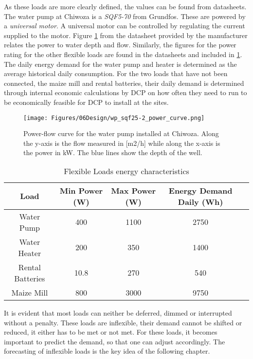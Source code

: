 As these loads are more clearly defined, the values can be found from datasheets\cite{wp_documentation}\cite{water_heater}\cite{maize_mill}. The water pump at Chiwoza is a \textit{SQF5-70} from Grundfos. These are powered by  a \textit{universal motor}. A universal motor can be controlled by regulating the current supplied to the motor. Figure \ref{fig:wp_power_flow_curve} from the datasheet provided by the manufacturer relates the power to water depth and flow. Similarly, the figures for the power rating for the other flexible loads are found in the datasheets and included in \ref{tab:flexible_loads_characteristics}. The daily energy demand for the water pump and heater is determined as the average historical daily consumption. For the two loads that have not been connected, the maize mill and rental batteries, their daily demand is determined through internal economic calculations by DCP on how often they need to run to be economically feasible for DCP to install at the sites.\\

\begin{figure}[]
    \centering
    \texttt{[image: Figures/06Design/wp\_sqf25-2\_power\_curve.png]}
    \caption[Water pump power/flow-curve]{Power-flow curve for the water pump installed at Chiwoza. Along the y-axis is the flow measured in [m2/h] while along the x-axis is the power in kW. The blue lines show the depth of the well.}
    \label{fig:wp_power_flow_curve}
\end{figure}

\begin{table}[]
    \centering
    \begin{tabular}{c|c|c|c|c}
       Load  & Min Power (W) & Max Power (W)& Energy Demand Daily (Wh) \\
       \hline
       Water Pump  & 400 & 1100 & 2750 \\
       Water Heater  & 200 & 350 & 1400 \\
       Rental Batteries  & 10.8 & 270 & 540 \\
       Maize Mill  & 800 & 3000 & 9750 \\
    \end{tabular}
    \caption[Flexible Loads energy characteristics]{Flexible Loads energy characteristics}
    \label{tab:flexible_loads_characteristics}
\end{table}

It is evident that most loads can neither be deferred, dimmed or interrupted without a penalty. These loads are inflexible, their demand cannot be shifted or reduced, it either has to be met or not met. For these loads, it becomes important to predict the demand, so that one can adjust accordingly. The forecasting of inflexible loads is the key idea of the following chapter. 


